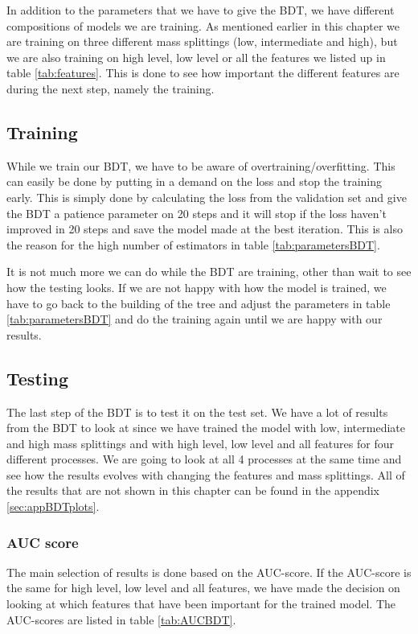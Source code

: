 In addition to the parameters that we have to give the BDT, we have different compositions of models we are training. As mentioned earlier in this chapter we are training on three different mass splittings (low, intermediate and high), but we are also training on high level, low level or all the features we listed up in table \ref{tab:features}. This is done to see how important the different features are during the next step, namely the training.

\subsection{Training}
While we train our BDT, we have to be aware of overtraining/overfitting. This can easily be done by putting in a demand on the loss and stop the training early. This is simply done by calculating the loss from the validation set and give the BDT a patience parameter on 20 steps and it will stop if the loss haven't improved in 20 steps and save the model made at the best iteration. This is also the reason for the high number of estimators in table \ref{tab:parametersBDT}. 

It is not much more we can do while the BDT are training, other than wait to see how the testing looks. If we are not happy with how the model is trained, we have to go back to the building of the tree and adjust the parameters in table \ref{tab:parametersBDT} and do the training again until we are happy with our results.

\subsection{Testing}
The last step of the BDT is to test it on the test set. We have a lot of results from the BDT to look at since we have trained the model with low, intermediate and high mass splittings and with high level, low level and all features for four different processes. We are going to look at all 4 processes at the same time and see how the results evolves with changing the features and mass splittings. All of the results that are not shown in this chapter can be found in the appendix \ref{sec:appBDTplots}. 

\subsubsection{AUC score}
The main selection of results is done based on the AUC-score. If the AUC-score is the same for high level, low level and all features, we have made the decision on looking at which features that have been important for the trained model. The AUC-scores are listed in table \ref{tab:AUCBDT}. 

